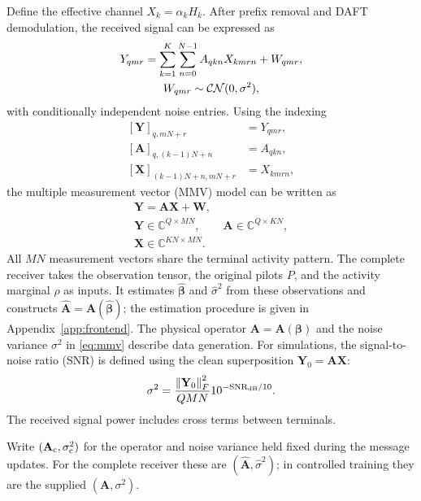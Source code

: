 Define the effective channel $X_k=\alpha_kH_k$.
After prefix removal and DAFT demodulation, the received signal can be expressed as
\begin{equation}
 \begin{gathered}
 Y_{qmr}=\sum_{k=1}^K\sum_{n=0}^{N-1}A_{qkn}X_{kmrn}+W_{qmr},
 \\
 W_{qmr}\sim\mathcal{CN}(0,\sigma^2),
 \end{gathered}
 \label{eq:observation-tensor}
\end{equation}
with conditionally independent noise entries.
Using the indexing
\begin{equation}
 \begin{aligned}
 [\mathbf Y]_{q,mN+r}&=Y_{qmr},\\
 [\mathbf A]_{q,(k-1)N+n}&=A_{qkn},\\
 [\mathbf X]_{(k-1)N+n,mN+r}&=X_{kmrn},
 \end{aligned}
 \label{eq:mmv-indexing}
\end{equation}
the multiple measurement vector (MMV) model can be written as
\begin{equation}
 \begin{gathered}
 \mathbf Y=\mathbf A\mathbf X+\mathbf W,\\
 \mathbf Y\in\mathbb C^{Q\times MN},\qquad
 \mathbf A\in\mathbb C^{Q\times KN},\\
 \mathbf X\in\mathbb C^{KN\times MN}.
 \end{gathered}
 \label{eq:mmv}
\end{equation}
All $MN$ measurement vectors share the terminal activity pattern.
The complete receiver takes the observation tensor, the original pilots $P$,
and the activity marginal $\rho$ as inputs. It estimates
$\widehat{\bm\beta}$ and $\widehat\sigma^2$ from these observations
and constructs $\widehat{\mathbf A}=\mathbf A(\widehat{\bm\beta})$;
the estimation procedure is given in Appendix~\ref{app:frontend}.
The physical operator $\mathbf A=\mathbf A(\bm\beta)$ and the noise
variance $\sigma^2$ in \eqref{eq:mmv} describe data generation.
For simulations, the signal-to-noise ratio (SNR)
is defined using the clean superposition $\mathbf Y_0=\mathbf A\mathbf X$:
\begin{equation}
 \sigma^2=\frac{\left\lVert\mathbf Y_0\right\rVert_F^2}{QMN}
 10^{-\mathrm{SNR}_{\rm dB}/10}.
 \label{eq:snr}
\end{equation}
The received signal power includes cross terms between terminals.

Write $(\mathbf A_{\rm c},\sigma_{\rm c}^2)$ for the operator and noise
variance held fixed during the message updates. For the
complete receiver these are $(\widehat{\mathbf A},\widehat\sigma^2)$;
in controlled training they are the supplied $(\mathbf A,\sigma^2)$.

